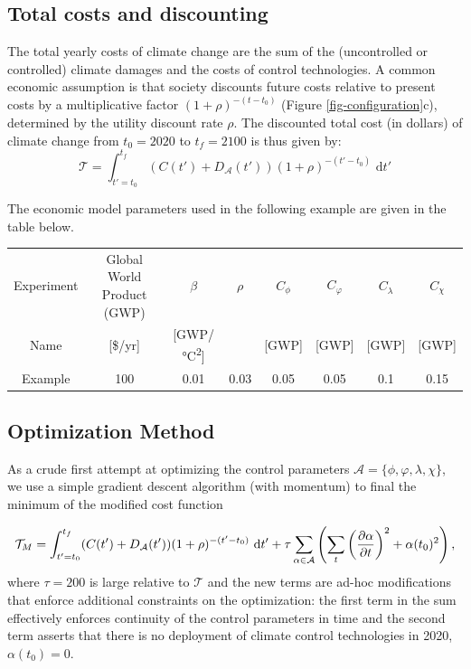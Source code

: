 \documentclass{article}
\begin{document}
\subsection{Total costs and discounting}

The total yearly costs of climate change are the sum of the (uncontrolled or controlled) climate damages and the costs of control technologies. A common economic assumption is that society discounts future costs relative to present costs by a multiplicative factor $(1 + \rho)^{-(t-t_{0})}$ (Figure \ref{fig-configuration}c), determined by the utility discount rate $\rho$. The discounted total cost (in dollars) of climate change from $t_{0} = 2020$ to $t_{f} = 2100$ is thus given by:
\begin{equation}
    \mathcal{T} =
    \int_{t'=t_{0}}^{t_{f}}
    (C(t') + D_{\mathcal{A}}(t')) (1 + \rho)^{-(t'-t_{0})} \text{ d}t'
\end{equation}

The economic model parameters used in the following example are given in the table below.

\begin{center}
 \begin{tabular}{|c || c | c | c | c | c | c | c||}
 \hline
 Experiment &
 Global World Product (GWP) &
 $\beta$ &
 $\rho$ &
 $C_{\phi}$ &
 $C_{\varphi}$ &
 $C_{\lambda}$ &
 $C_{\chi}$ \\
 Name &
 [\si{\$/yr}] &
 [\si{GWP/\celsius^{2}}] &
 &
 [\si{GWP}] &
 [\si{GWP}] &
 [\si{GWP}] &
 [\si{GWP}] \\[0.5ex]
 \hline\hline
 Example &
 100 &
 0.01 &
 0.03 &
 0.05 &
 0.05 &
 0.1 &
 0.15 \\ 
 \hline
\end{tabular}
\end{center}

\subsection{Optimization Method}

As a crude first attempt at optimizing the control parameters $\mathcal{A} = \{\phi, \varphi, \lambda, \chi\}$, we use a simple gradient descent algorithm (with momentum) to final the minimum of the modified cost function

\begin{equation}
    \mathcal{T}_{M} =
    \int_{t'=t_{0}}^{t_{f}}
    (C(t') + D_{\mathcal{A}}(t')) (1 + \rho)^{-(t'-t_{0})} \text{ d}t'
    + \tau \sum_{\alpha \in \mathcal{A}} \left( \sum_{t} \left(\pdv{\alpha}{t} \right)^{2} + \alpha(t_{0})^{2} \right),
\end{equation}
where $\tau = 200$ is large relative to $\mathcal{T}$ and the new terms are ad-hoc modifications that enforce additional constraints on the optimization: the first term in the sum effectively enforces continuity of the control parameters in time and the second term asserts that there is no deployment of climate control technologies in 2020, $\alpha(t_{0})=0$.
\end{document}
